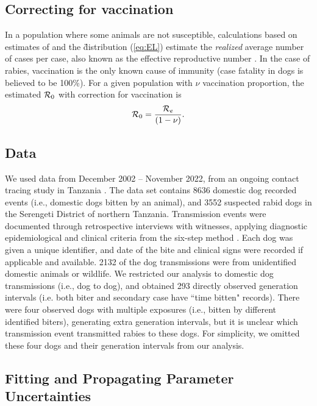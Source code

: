 \FloatBarrier

\subsection*{Correcting for vaccination}

In a population where some animals are not susceptible, calculations based on estimates of \littler and the \G distribution (\ref{eq:EL}) estimate the \emph{realized} average number of cases per case, also known as the effective reproductive number \re.
In the case of rabies, vaccination is the only known cause of immunity (case fatality in dogs is believed to be 100\%).
For a given population with $\nu$ vaccination proportion, the estimated ${\mathcal R}_0$ with correction for vaccination is
\begin{equation}
{\mathcal R}_0 = \frac{{\mathcal R}_{e}}{(1 - \nu)}.
\label{eq:RE}
\end{equation}

\subsection*{Data}



We used data from December 2002 -- November 2022, from an ongoing contact tracing study in Tanzania \citep{hampson2008rabies, hampson2009transmission}.
The data set contains 8636 domestic dog recorded events (i.e., domestic dogs bitten by an animal), and 3552 suspected rabid dogs in the Serengeti District of northern Tanzania.
Transmission events were documented through retrospective interviews with witnesses, applying diagnostic epidemiological and clinical criteria from the six-step method \citep{tepsumethanon2005six}.
Each dog was given a unique identifier, and date of the bite and clinical signs were recorded if applicable and available.
2132 of the dog transmissions were from unidentified domestic animals or wildlife.
We restricted our analysis to domestic dog transmissions (i.e., dog to dog), and obtained 293 directly observed generation intervals (i.e. both biter and secondary case have ``time bitten" records).
There were four observed dogs with multiple exposures (i.e., bitten by different identified biters), generating extra generation intervals, but it is unclear which transmission event transmitted rabies to these dogs.
For simplicity, we omitted these four dogs and their generation intervals from our analysis.

\subsection*{Fitting and Propagating Parameter Uncertainties}



